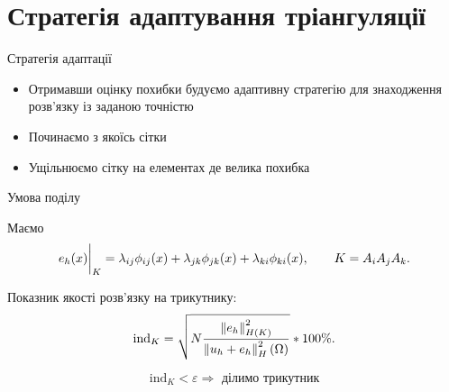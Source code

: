 
\section{Стратегія адаптування тріангуляції}
\frame{\sectionpage}

\begin{frame}{Стратегія адаптації}

	\begin{itemize}
		\item Отримавши оцінку похибки будуємо адаптивну стратегію для знаходження розв'язку із заданою точністю
		\item Починаємо з якоїсь сітки
		\item Ущільнюємо сітку на елементах де велика похибка
	\end{itemize}

\end{frame}

\begin{frame}{Умова поділу}

	Маємо
	\begin{equation}\label{eq:error_element}
		e_h(x)\bigg|_K = \lambda_{ij} \phi_{ij}(x)+\lambda_{jk} \phi_{jk}(x)+\lambda_{ki} \phi_{ki}(x), \qquad K = A_iA_jA_k.
	\end{equation}

	Показник якості розв'язку на трикутнику:
	\begin{equation}\label{eq:error_indicator}
		\text{ind}_K = \sqrt{N \frac
				{\left\lVert e_h\right\rVert^2_{H(K)}}
				{\left\lVert u_h+e_h\right\rVert^2_H(\Omega)}
		}*100\%.
	\end{equation}

	\begin{equation*}\label{eq:error_indicator}
		\text{ind}_K < \varepsilon \Rightarrow \text{ ділимо трикутник}
	\end{equation*}

\end{frame}

\undeff{\error}
